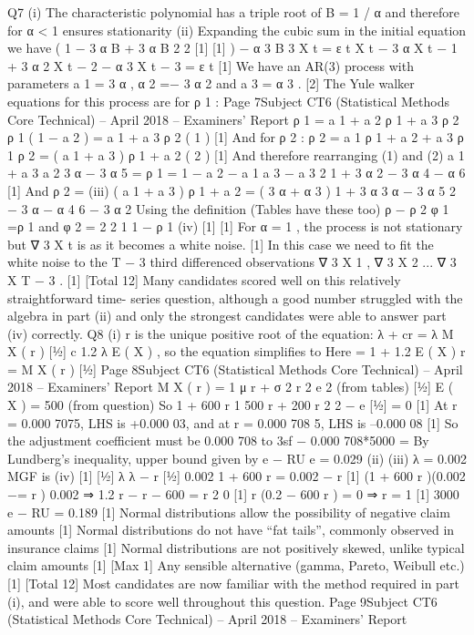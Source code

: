 Q7
(i) The characteristic polynomial has a triple root of B = 1 / α
and therefore for α < 1 ensures stationarity
(ii) Expanding the cubic sum in the initial equation we have
( 1 − 3 α B + 3 α B
2 2
[1]
[1]
)
− α 3 B 3 X t = ε t
X t − 3 α X t − 1 + 3 α 2 X t − 2 − α 3 X t − 3 = ε t
[1]
We have an AR(3) process with parameters a 1 = 3 α , α 2 =− 3 α 2 and a 3 = α 3
.
[2]
The Yule walker equations for this process are for ρ 1 :
Page 7Subject CT6 (Statistical Methods Core Technical) – April 2018 – Examiners’ Report
ρ 1 = a 1 + a 2 ρ 1 + a 3 ρ 2
ρ 1 ( 1 − a 2 ) =           
a 1 + a 3 ρ 2
( 1 )
[1]
And for ρ 2 :
ρ 2 = a 1 ρ 1 + a 2 + a 3 ρ 1
ρ 2 =
( a 1 + a 3 ) ρ 1 + a 2           ( 2 )
[1]
And therefore rearranging (1) and (2)
a 1 + a 3 a 2
3 α − 3 α 5
=
ρ 1
=
1 − a 2 − a 1 a 3 − a 3 2 1 + 3 α 2 − 3 α 4 − α 6
[1]
And
ρ 2 =
(iii)
( a 1 + a 3 ) ρ 1 + a 2 =
(
3 α + α 3
) 1 + 3 α
3 α − 3 α 5
2
− 3 α − α
4
6
− 3 α 2
Using the definition (Tables have these too)
ρ − ρ 2
φ 1 =ρ 1   
and φ 2 = 2 2 1
1 − ρ 1
(iv)
[1]
[1]
For α = 1 , the process is not stationary but ∇ 3 X t is as it becomes a white
noise.
[1]
In this case we need to fit the white noise to the T − 3 third differenced
observations ∇ 3 X 1 , ∇ 3 X 2 ... ∇ 3 X T − 3 .
[1]
[Total 12]
Many candidates scored well on this relatively straightforward time-
series question, although a good number struggled with the algebra in
part (ii) and only the strongest candidates were able to answer part (iv)
correctly.
Q8
(i)
r is the unique positive root of the equation:
λ + cr = λ M X ( r )
[1⁄2]
c 1.2 λ E ( X ) , so the equation simplifies to
Here =
1 + 1.2 E ( X ) r =
M X ( r )
[1⁄2]
Page 8Subject CT6 (Statistical Methods Core Technical) – April 2018 – Examiners’ Report
M X ( r ) =
1
μ r + σ 2 r 2
e 2
(from tables)
[1⁄2]
E ( X ) = 500 (from question)
So 1 + 600 r
1
500 r + 200 r 2
2
− e
[1⁄2]
= 0
[1]
At r = 0.000 7075, LHS is +0.000 03, and at r = 0.000 708 5, LHS is
–0.000 08
[1]
So the adjustment coefficient must be 0.000 708 to 3sf
− 0.000 708*5000
=
By Lundberg’s inequality, upper bound given
by e − RU e =
0.029
(ii)
(iii)
λ = 0.002
MGF is
(iv)
[1]
[1⁄2]
λ
λ − r
[1⁄2]
0.002
1 + 600 r =
0.002 − r [1]
(1 + 600 r )(0.002 −=
r ) 0.002 ⇒ 1.2 r − r − 600 =
r 2 0 [1]
r (0.2 − 600 r ) = 0 ⇒ r = 1 [1]
3000
e − RU = 0.189 [1]
Normal distributions allow the possibility of negative claim amounts [1]
Normal distributions do not have “fat tails”, commonly observed in insurance
claims
[1]
Normal distributions are not positively skewed, unlike typical claim amounts
[1]
[Max 1]
Any sensible alternative (gamma, Pareto, Weibull etc.)
[1]
[Total 12]
Most candidates are now familiar with the method required in part (i),
and were able to score well throughout this question.
Page 9Subject CT6 (Statistical Methods Core Technical) – April 2018 – Examiners’ Report
